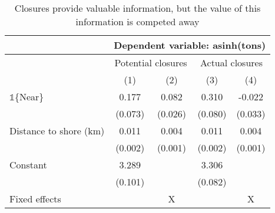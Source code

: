 \begin{table}[tb]
\centering
\caption{Closures provide valuable information, but the value of this information is competed away} 
\label{information_valuable}
\begin{tabular}{lcccc}
   \toprule & \multicolumn{4}{c}{Dependent variable: asinh(tons)} \\  \midrule & \multicolumn{2}{c}{Potential closures} & \multicolumn{2}{c}{Actual closures} \\ & (1) & (2) & (3) & (4) \\ 
   \midrule $\mathbb{1}$\{Near\} & 0.177 & 0.082 & 0.310 & -0.022 \\ 
   & (0.073) & (0.026) & (0.080) & (0.033) \\ 
  Distance to shore (km) & 0.011 & 0.004  & 0.011 & 0.004 \\ 
   & (0.002) & (0.001) & (0.002) & (0.001)  \\ 
  Constant & 3.289 &  & 3.306 &  \\ 
   & (0.101) &  & (0.082) &  \\ 
   \midrule Fixed effects & & X & & X\\  \bottomrule \end{tabular}
\end{table}
